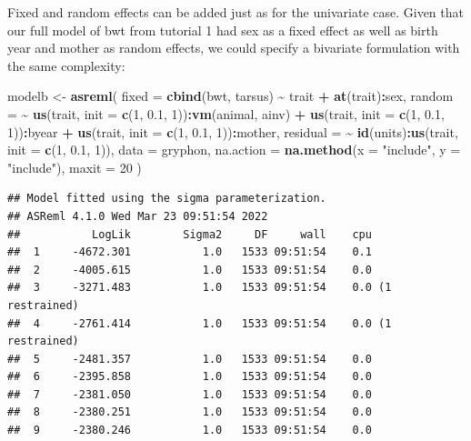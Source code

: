 \documentclass[
  12pt,
]{book}
\newenvironment{Shaded}{\begin{snugshade}}{\end{snugshade}}
\newcommand{\DataTypeTok}[1]{\textcolor[rgb]{0.13,0.29,0.53}{#1}}
\newcommand{\DecValTok}[1]{\textcolor[rgb]{0.00,0.00,0.81}{#1}}
\newcommand{\FloatTok}[1]{\textcolor[rgb]{0.00,0.00,0.81}{#1}}
\newcommand{\KeywordTok}[1]{\textcolor[rgb]{0.13,0.29,0.53}{\textbf{#1}}}
\newcommand{\NormalTok}[1]{#1}
\newcommand{\OperatorTok}[1]{\textcolor[rgb]{0.81,0.36,0.00}{\textbf{#1}}}
\newcommand{\StringTok}[1]{\textcolor[rgb]{0.31,0.60,0.02}{#1}}
\begin{document}
Fixed and random effects can be added just as for the univariate case. Given that our full model of bwt from tutorial 1 had sex as a fixed effect as well as birth year and mother as random effects, we could specify a bivariate formulation with the same complexity:

\begin{Shaded}
\begin{Highlighting}[]
\NormalTok{modelb \textless{}{-}}\StringTok{ }\KeywordTok{asreml}\NormalTok{(}
  \DataTypeTok{fixed =} \KeywordTok{cbind}\NormalTok{(bwt, tarsus) }\OperatorTok{\textasciitilde{}}\StringTok{ }\NormalTok{trait }\OperatorTok{+}\StringTok{ }\KeywordTok{at}\NormalTok{(trait)}\OperatorTok{:}\NormalTok{sex,}
  \DataTypeTok{random =} \OperatorTok{\textasciitilde{}}\StringTok{ }\KeywordTok{us}\NormalTok{(trait, }\DataTypeTok{init =} \KeywordTok{c}\NormalTok{(}\DecValTok{1}\NormalTok{, }\FloatTok{0.1}\NormalTok{, }\DecValTok{1}\NormalTok{))}\OperatorTok{:}\KeywordTok{vm}\NormalTok{(animal, ainv) }\OperatorTok{+}
\StringTok{    }\KeywordTok{us}\NormalTok{(trait, }\DataTypeTok{init =} \KeywordTok{c}\NormalTok{(}\DecValTok{1}\NormalTok{, }\FloatTok{0.1}\NormalTok{, }\DecValTok{1}\NormalTok{))}\OperatorTok{:}\NormalTok{byear }\OperatorTok{+}
\StringTok{    }\KeywordTok{us}\NormalTok{(trait, }\DataTypeTok{init =} \KeywordTok{c}\NormalTok{(}\DecValTok{1}\NormalTok{, }\FloatTok{0.1}\NormalTok{, }\DecValTok{1}\NormalTok{))}\OperatorTok{:}\NormalTok{mother,}
  \DataTypeTok{residual =} \OperatorTok{\textasciitilde{}}\StringTok{ }\KeywordTok{id}\NormalTok{(units)}\OperatorTok{:}\KeywordTok{us}\NormalTok{(trait, }\DataTypeTok{init =} \KeywordTok{c}\NormalTok{(}\DecValTok{1}\NormalTok{, }\FloatTok{0.1}\NormalTok{, }\DecValTok{1}\NormalTok{)),}
  \DataTypeTok{data =}\NormalTok{ gryphon,}
  \DataTypeTok{na.action =} \KeywordTok{na.method}\NormalTok{(}\DataTypeTok{x =} \StringTok{"include"}\NormalTok{, }\DataTypeTok{y =} \StringTok{"include"}\NormalTok{),}
  \DataTypeTok{maxit =} \DecValTok{20}
\NormalTok{)}
\end{Highlighting}
\end{Shaded}

\begin{verbatim}
## Model fitted using the sigma parameterization.
## ASReml 4.1.0 Wed Mar 23 09:51:54 2022
##           LogLik        Sigma2     DF     wall    cpu
##  1     -4672.301           1.0   1533 09:51:54    0.1
##  2     -4005.615           1.0   1533 09:51:54    0.0
##  3     -3271.483           1.0   1533 09:51:54    0.0 (1 restrained)
##  4     -2761.414           1.0   1533 09:51:54    0.0 (1 restrained)
##  5     -2481.357           1.0   1533 09:51:54    0.0
##  6     -2395.858           1.0   1533 09:51:54    0.0
##  7     -2381.050           1.0   1533 09:51:54    0.0
##  8     -2380.251           1.0   1533 09:51:54    0.0
##  9     -2380.246           1.0   1533 09:51:54    0.0
\end{verbatim}
\end{document}
